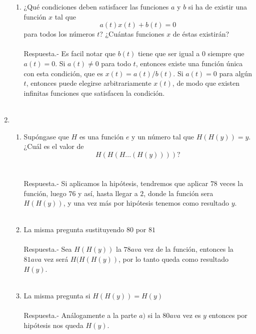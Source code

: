 \begin{enumerate}[\bfseries 1.]
\begin{enumerate}[\bfseries (a)]
	    \item ¿Qué condiciones deben satisfacer las funciones $a$ y $b$ si ha de existir una función $x$ tal que $$a(t)x(t)+b(t)=0$$ para todos los números $t$? ¿Cuántas funciones $x$ de éstas existirán?\\\\
	    Respuesta.-\; Es facil notar que $b(t)$ tiene que ser igual a $0$ siempre que $a(t) = 0$. Si $a(t) \neq 0$ para todo $t$, entonces existe una función única con esta condición, que es $x(t) = a(t)/b(t)$. Si $a(t)=0$ para algún $t$, entonces puede elegirse arbitrariamente $x(t)$, de modo que existen infinitas funciones que satisfacen la condición.\\\\

	\end{enumerate}

	\item 

	\begin{enumerate}[\bfseries (a)]

	    \item Supóngase que $H$ es una función $e$ y un número tal que $H(H(y))=y$. ¿Cuál es el valor de $$H(H(H...(H(y))))?$$\\\\
	    Respuesta.-\; Si aplicamos la hipótesis, tendremos que aplicar $78$ veces la función, luego $76$ y así, hasta llegar a $2$, donde la función sera $H(H(y))$, y una vez más por hipótesis tenemos como resultado $y$.\\\\

	    \item La misma pregunta sustituyendo $80$ por $81$\\\\
	    Respuesta.-\; Sea $H(H(y))$ la $78ava$ vez de la función, entonces la $81ava$ vez será $H(H(H(y))$, por lo tanto queda como resultado $H(y)$.\\\\ 

	    \item La misma pregunta si $H(H(y))=H(y)$\\\\
	    Respuesta.-\; Análogamente a la parte $a)$ si la $80ava$ vez es $y$ entonces por hipótesis nos queda $H(y)$.\\\\ 


\end{enumerate}
\end{enumerate}
